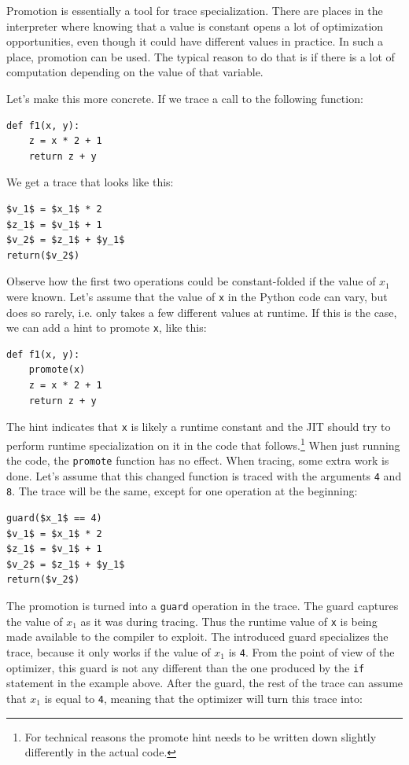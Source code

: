 \documentclass{sigplanconf}
\begin{document}
Promotion is essentially a tool for trace specialization. There are places in
the interpreter where knowing that a value is constant opens a lot of
optimization opportunities, even though it
could have different values in practice. In such a place, promotion can be used. The
typical reason to do that is if there is
a lot of computation depending on the value of that variable.

Let's make this more concrete. If we trace a call to the following function:
\begin{lstlisting}[mathescape,basicstyle=\ttfamily]
def f1(x, y):
    z = x * 2 + 1
    return z + y
\end{lstlisting}

We get a trace that looks like this:

\begin{lstlisting}[mathescape,basicstyle=\ttfamily]
$v_1$ = $x_1$ * 2
$z_1$ = $v_1$ + 1
$v_2$ = $z_1$ + $y_1$
return($v_2$)
\end{lstlisting}

Observe how the first two operations could be constant-folded if the value of
$x_1$ were known. Let's assume that the value of \texttt{x} in the Python code can vary, but does so
rarely, i.e. only takes a few different values at runtime. If this is the
case, we can add a hint to promote \texttt{x}, like this:
\begin{lstlisting}[mathescape,basicstyle=\ttfamily]
def f1(x, y):
    promote(x)
    z = x * 2 + 1
    return z + y
\end{lstlisting}

The hint indicates that \texttt{x} is likely a runtime constant and the JIT
should try to perform runtime specialization on it
in the code that follows.\footnote{For technical reasons the promote hint needs
to be written down slightly differently in the actual code.}  When just running
the code, the \texttt{promote} function has no
effect. When tracing, some extra work
is done. Let's assume that this changed function is traced with
the arguments \texttt{4} and \texttt{8}. The trace will be the same, except for one
operation at the beginning:

\begin{lstlisting}[mathescape,basicstyle=\ttfamily]
guard($x_1$ == 4)
$v_1$ = $x_1$ * 2
$z_1$ = $v_1$ + 1
$v_2$ = $z_1$ + $y_1$
return($v_2$)
\end{lstlisting}

The promotion is turned into a \texttt{guard} operation in the trace. The guard
captures the value of $x_1$ as it was during tracing. Thus the runtime value of
\texttt{x} is being made available to the compiler to exploit. The introduced
guard specializes the trace, because it only works if the value of $x_1$ is
\texttt{4}. From the point of view of the
optimizer, this guard is not any different than the one produced by the \texttt{if}
statement in the example above. After the guard, the rest of the trace can
assume that $x_1$ is equal to \texttt{4}, meaning that the optimizer will turn this
trace into:
\end{document}
